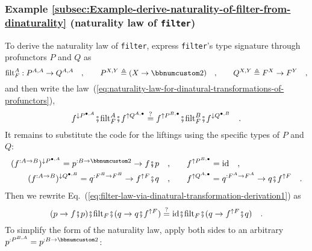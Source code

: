 \subsubsection{Example \label{subsec:Example-derive-naturality-of-filter-from-dinaturality}\ref{subsec:Example-derive-naturality-of-filter-from-dinaturality}
(naturality law of \lstinline!filter!)}

To derive the naturality law of \lstinline!filter!, express \lstinline!filter!\textsf{'}s
type signature through profunctors $P$ and $Q$ as
\[
\text{filt}_{F}^{A}:P^{A,A}\rightarrow Q^{A,A}\quad,\quad\quad P^{X,Y}\triangleq(X\rightarrow\bbnum 2)\quad,\quad\quad Q^{X,Y}\triangleq F^{X}\rightarrow F^{Y}\quad,
\]
and then write the law~(\ref{eq:naturality-law-for-dinatural-transformations-of-profunctors}),
\begin{equation}
f^{\downarrow P^{\bullet,A}}\bef\text{filt}_{F}^{A}\bef f^{\uparrow Q^{A,\bullet}}\overset{?}{=}f^{\uparrow P^{B,\bullet}}\bef\text{filt}_{F}^{B}\bef f^{\downarrow Q^{\bullet,B}}\quad.\label{eq:filter-law-via-dinatural-transformation-derivation1}
\end{equation}
It remains to substitute the code for the liftings using the specific
types of $P$ and $Q$:
\begin{align*}
(f^{:A\rightarrow B})^{\downarrow P^{\bullet,A}}=p^{:B\rightarrow\bbnum 2}\rightarrow f\bef p\quad, & \quad\quad f^{\uparrow P^{B,\bullet}}=\text{id}\quad,\\
(f^{:A\rightarrow B})^{\downarrow Q^{\bullet,B}}=q^{:F^{B}\rightarrow F^{B}}\rightarrow f^{\uparrow F}\bef q\quad, & \quad\quad f^{\uparrow Q^{A,\bullet}}=q^{:F^{A}\rightarrow F^{A}}\rightarrow q\bef f^{\uparrow F}\quad.
\end{align*}
Then we rewrite Eq.~(\ref{eq:filter-law-via-dinatural-transformation-derivation1})
as
\[
(p\rightarrow f\bef p)\bef\text{filt}_{F}\bef(q\rightarrow q\bef f^{\uparrow F})\overset{?}{=}\text{id}\bef\text{filt}_{F}\bef(q\rightarrow f^{\uparrow F}\bef q)\quad.
\]
To simplify the form of the naturality law, apply both sides to an
arbitrary $p^{:P^{B,A}}=p^{:B\rightarrow\bbnum 2}$:
